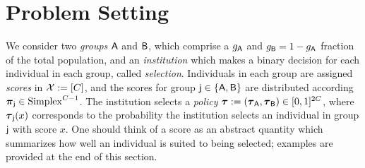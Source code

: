 
\section{Problem Setting}
\label{sec:problem setting }
\label{sec:models_and_notation}
We consider two \emph{groups} $\mathsf{A}$ and $\mathsf{B}$, which comprise a $g_{\mathsf{A}}$ and $g_{\mathsf{B}} = 1 - g_{\mathsf{A}}$ fraction of the total population, and an \emph{institution} which makes a binary decision for each individual in each group, called \emph{selection}. 
Individuals in each group are assigned \emph{scores} in $\mathcal{X} := [C]$, 
and the scores for group $\mathsf{j} \in \{\mathsf{A},\mathsf{B}\}$ are distributed according $\boldsymbol{\pi}_{\mathsf{j}} \in \mathrm{Simplex}^{C-1}$. 
The institution selects a \emph{policy} $\boldsymbol{\tau}:=(\boldsymbol{\tau}_{\mathsf{A}},\boldsymbol{\tau}_{\mathsf{B}})\in[0,1]^{2C}$, where $\boldsymbol{\tau}_{\mathsf{j}}(x)$ corresponds to the probability the institution selects an individual in group $\mathsf{j}$ with score $x$. 
One should think of a score as an abstract quantity which summarizes how well an individual is suited to being selected; examples are provided at the end of this section.

